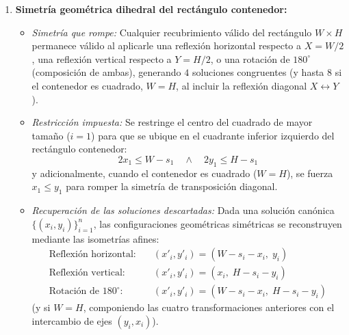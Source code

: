 \begin{enumerate}
    \item \textbf{Simetría geométrica dihedral del rectángulo contenedor:}
    \begin{itemize}
        \item \textit{Simetría que rompe:} Cualquier recubrimiento válido del rectángulo $W \times H$ permanece válido al aplicarle una reflexión horizontal respecto a $X = W/2$, una reflexión vertical respecto a $Y = H/2$, o una rotación de $180^\circ$ (composición de ambas), generando $4$ soluciones congruentes (y hasta $8$ si el contenedor es cuadrado, $W = H$, al incluir la reflexión diagonal $X \leftrightarrow Y$).
        \item \textit{Restricción impuesta:} Se restringe el centro del cuadrado de mayor tamaño ($i = 1$) para que se ubique en el cuadrante inferior izquierdo del rectángulo contenedor:
        \[
            2 x_1 \le W - s_1 \quad \land \quad 2 y_1 \le H - s_1
        \]
        y adicionalmente, cuando el contenedor es cuadrado ($W = H$), se fuerza $x_1 \le y_1$ para romper la simetría de transposición diagonal.
        \item \textit{Recuperación de las soluciones descartadas:} Dada una solución canónica $\{(x_i, y_i)\}_{i=1}^n$, las configuraciones geométricas simétricas se reconstruyen mediante las isometrías afines:
        \begin{align*}
            \text{Reflexión horizontal:}   &\quad (x'_i, y'_i) = (W - s_i - x_i, \; y_i) \\
            \text{Reflexión vertical:}     &\quad (x'_i, y'_i) = (x_i, \; H - s_i - y_i) \\
            \text{Rotación de } 180^\circ: &\quad (x'_i, y'_i) = (W - s_i - x_i, \; H - s_i - y_i)
        \end{align*}
        (y si $W = H$, componiendo las cuatro transformaciones anteriores con el intercambio de ejes $(y_i, x_i)$).
    \end{itemize}
\end{enumerate}

